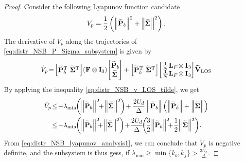 \begin{proof}
    Consider the following Lyapunov function candidate
    \begin{equation}
        V_p = \frac{1}{2} \left(\left\|\widetilde{\mathbf{P}}_{b}\right\|^2 + \left\|\widetilde{\bm{\Sigma}}\right\|^2\right).
    \end{equation}
    The derivative of $V_p$ along the trajectories of \eqref{eq:distr_NSB_P_Sigma_subsystem} is given by
    \begin{equation}
        \dot{V}_{p\!} = \!
        \begin{bmatrix}
            {\widetilde{\mat{P}}}_{b}\T\!\!\!\! & \widetilde{\bs{\Sigma}}\T
        \end{bmatrix} \!
        \left(\mat{F} \otimes \mat{I}_3\right) \!
        \begin{bmatrix}
            {\widetilde{\mat{P}}}_{b\!} \\ {\widetilde{\bs{\Sigma}}}
        \end{bmatrix}
        +
        \begin{bmatrix}
            {\widetilde{\mat{P}}}_{b}\T\!\!\!\! & \widetilde{\bs{\Sigma}}\T
        \end{bmatrix} \!
        \begin{bmatrix}
            \frac{1}{N} \mat{L}_{F\!} \otimes \mat{I}_3 \\ \frac{1}{N} \mat{L}_{F\!} \otimes \mat{I}_3
        \end{bmatrix} \!
        \widetilde{\mat{V}}_{\rm LOS}
    \end{equation}
    By applying the inequality \eqref{eq:distr_NSB_v_LOS_tilde}, we get
    \begin{align}
        \dot{V}_{p}\! &\leq \!
        - \lambda_{\min\!\!} \left(\norm{\widetilde{\mat{P}}_{b}}^{2} \!\!+ \!\norm{\widetilde{\bs{\Sigma}}}^{2\,}\!\right) \!
        + \frac{2U_d}{\Delta} \norm{\widetilde{\mat{P}}_{b}} \left(\norm{\widetilde{\mat{P}}_{b}} + \norm{\widetilde{\bs{\Sigma}}}\right) \nonumber \\
        &\leq \! - \lambda_{\min\!\!} \left(\norm{\widetilde{\mat{P}}_{b}}^{2\!} \!\!+ \!\norm{\widetilde{\bs{\Sigma}}}^{2\,}\!\right) \!
        + \! \frac{2U_d}{\Delta} \! \bigg(\!\frac{3}{2}\!\norm{\widetilde{\mat{P}}_{b}}^{2\!} \!\!+ \!\frac{1}{2}\!\norm{\widetilde{\bs{\Sigma}}}^{2\,}\!\!\mathrlap{\bigg).} \label{eq:distr_NSB_lyapunov_analysis1}
    \end{align}
    From \eqref{eq:distr_NSB_lyapunov_analysis1}, we can conclude that $\dot{V}_p$ is negative definite, and the subsystem is thus \glspl{ges}, if $\lambda_{\min} \geq \min\{k_b, k_f\} > \frac{3U_d}{\Delta}$.        
\end{proof}

